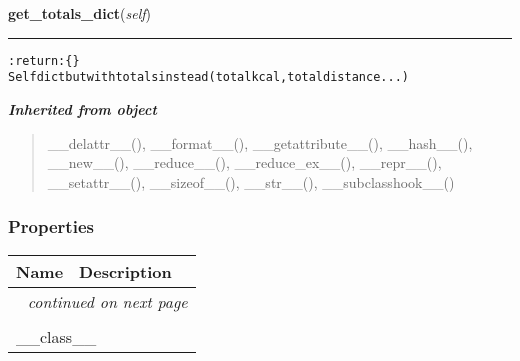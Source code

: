     \label{pygce:models:garmin:timeline:GCDayActivities:get_totals_dict}

    \vspace{0.5ex}

\hspace{.8\funcindent}\begin{boxedminipage}{\funcwidth}

    \raggedright \textbf{get\_totals\_dict}(\textit{self})

    \vspace{-1.5ex}

    \rule{\textwidth}{0.5\fboxrule}
\setlength{\parskip}{2ex}
\begin{alltt}

:return: \{\}
    Self dict but with totals instead (total kcal, total distance ...)
\end{alltt}

\setlength{\parskip}{1ex}
    \end{boxedminipage}


\large{\textbf{\textit{Inherited from object}}}

\begin{quote}
\_\_delattr\_\_(), \_\_format\_\_(), \_\_getattribute\_\_(), \_\_hash\_\_(), \_\_new\_\_(), \_\_reduce\_\_(), \_\_reduce\_ex\_\_(), \_\_repr\_\_(), \_\_setattr\_\_(), \_\_sizeof\_\_(), \_\_str\_\_(), \_\_subclasshook\_\_()
\end{quote}


  \subsubsection{Properties}

    \vspace{-1cm}
\hspace{\varindent}\begin{longtable}{|p{\varnamewidth}|p{\vardescrwidth}|l}
\cline{1-2}
\cline{1-2} \centering \textbf{Name} & \centering \textbf{Description}& \\
\cline{1-2}
\endhead\cline{1-2}\multicolumn{3}{r}{\small\textit{continued on next page}}\\\endfoot\cline{1-2}
\endlastfoot\multicolumn{2}{|l|}{\textit{Inherited from object}}\\
\multicolumn{2}{|p{\varwidth}|}{\raggedright \_\_class\_\_}\\
\cline{1-2}
\end{longtable}

